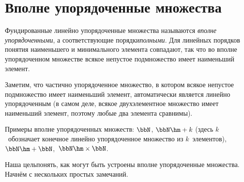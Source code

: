\section{Вполне упорядоченные множества}
        \label{well-ordered-sets}

Фундированные линейно упорядоченные множества называются
\emph{вполне упорядоченными}, а соответствующие порядки\т \emph{полными}.
Для линейных порядков понятия наименьшего и минимального
элемента совпадают, так что во вполне упорядоченном множестве
всякое непустое подмножество имеет наименьший элемент.

Заметим, что частично упорядоченное множество, в котором всякое
непустое подмножество имеет наименьший элемент, автоматически
является линейно упорядоченным (в самом деле, всякое
двухэлементное множество имеет наименьший элемент, поэтому любые
два элемента сравнимы).

Примеры вполне упорядоченных множеств: $\bbN$,
$\bbN\hm+k$ (здесь $k$~обозначает конечное линейно
упорядоченное множество из $k$~элементов),
$\bbN\hm+\bbN$,~$\bbN\hm\times\bbN$.

Наша цель\т понять, как могут быть устроены вполне
упорядоченные множества. Начнём с нескольких простых
замечаний.

